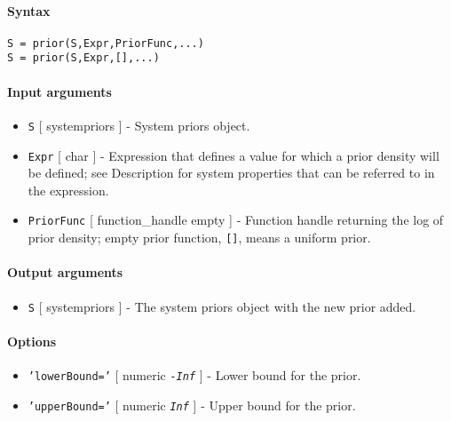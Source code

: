 


	\paragraph{Syntax}\label{syntax}

\begin{verbatim}
S = prior(S,Expr,PriorFunc,...)
S = prior(S,Expr,[],...)
\end{verbatim}

\paragraph{Input arguments}\label{input-arguments}

\begin{itemize}
\item
  \texttt{S} {[} systempriors {]} - System priors object.
\item
  \texttt{Expr} {[} char {]} - Expression that defines a value for which
  a prior density will be defined; see Description for system properties
  that can be referred to in the expression.
\item
  \texttt{PriorFunc} {[} function\_handle \textbar{} empty {]} -
  Function handle returning the log of prior density; empty prior
  function, \texttt{{[}{]}}, means a uniform prior.
\end{itemize}

\paragraph{Output arguments}\label{output-arguments}

\begin{itemize}
\itemsep1pt\parskip0pt
\item
  \texttt{S} {[} systempriors {]} - The system priors object with the
  new prior added.
\end{itemize}

\paragraph{Options}\label{options}

\begin{itemize}
\item
  \texttt{'lowerBound='} {[} numeric \textbar{} \emph{\texttt{-Inf}} {]}
  - Lower bound for the prior.
\item
  \texttt{'upperBound='} {[} numeric \textbar{} \emph{\texttt{Inf}} {]}
  - Upper bound for the prior.
\end{itemize}

